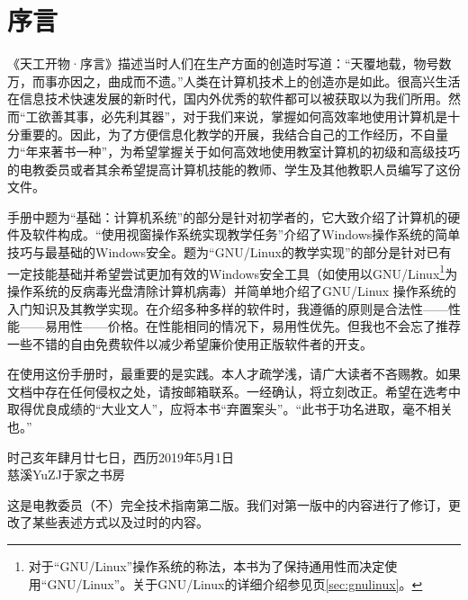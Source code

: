\chapter{序言}
《天工开物·序言》描述当时人们在生产方面的创造时写道：“天覆地载，物号数万，而事亦因之，曲成而不遗。”人类在计算机技术上的创造亦是如此。很高兴生活在信息技术快速发展的新时代，国内外优秀的软件都可以被获取以为我们所用。然而“工欲善其事，必先利其器”，对于我们来说，掌握如何高效率地使用计算机是十分重要的。因此，为了方便信息化教学的开展，我结合自己的工作经历，不自量力“年来著书一种”，为希望掌握关于如何高效地使用教室计算机的初级和高级技巧的电教委员或者其余希望提高计算机技能的教师、学生及其他教职人员编写了这份文件。\par
手册中题为“基础：计算机系统”的部分是针对初学者的，它大致介绍了计算机的硬件及软件构成。“使用视窗操作系统实现教学任务”介绍了Windows操作系统的简单技巧与最基础的Windows安全。题为“GNU/Linux的教学实现”的部分是针对已有一定技能基础并希望尝试更加有效的Windows安全工具（如使用以GNU/Linux\footnote{对于“GNU/Linux”操作系统的称法，本书为了保持通用性而决定使用“GNU/Linux”\cite{Why-GNULinux}。关于GNU/Linux的详细介绍参见\pageref{sec:gnulinux}页\ref{sec:gnulinux}。}为操作系统的反病毒光盘清除计算机病毒）并简单地介绍了GNU/Linux 操作系统的入门知识及其教学实现。在介绍多种多样的软件时，我遵循的原则是合法性——性能——易用性——价格。在性能相同的情况下，易用性优先。但我也不会忘了推荐一些不错的自由免费软件以减少希望廉价使用正版软件者的开支。\par
在使用这份手册时，最重要的是实践。本人才疏学浅，请广大读者不吝赐教。如果文档中存在任何侵权之处，请按邮箱联系。一经确认，将立刻改正。希望在选考中取得优良成绩的“大业文人”，应将本书“弃置案头”。“此书于功名进取，毫不相关也。”\par
\begin{flushright}
时己亥年肆月廿七日，西历2019年5月1日\\
慈溪YuZJ于家之书房
\end{flushright}\par
这是电教委员（不）完全技术指南第二版。我们对第一版中的内容进行了修订，更改了某些表述方式以及过时的内容。
